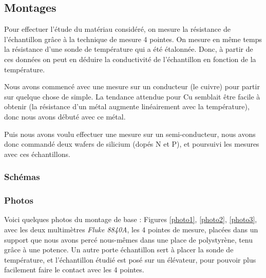 \subsection{Montages}
Pour effectuer l'étude du matériau considéré, on mesure la résistance de l'échantillon grâce à la technique de mesure 4 pointes.
On mesure en même temps la résistance d'une sonde de température qui a été étalonnée.
Donc, à partir de ces données on peut en déduire la conductivité de l'échantillon en fonction de la température.

Nous avons commencé avec une mesure sur un conducteur (le cuivre) pour partir sur quelque chose de simple.
La tendance attendue pour Cu semblait être facile à obtenir (la résistance d'un métal augmente linéairement avec la température), donc nous avons débuté avec ce métal.

Puis nous avons voulu effectuer une mesure sur un semi-conducteur, nous avons donc commandé deux wafers de silicium (dopés N et P), et poursuivi les mesures avec ces échantillons.

\subsubsection{Schémas}

\subsubsection{Photos}

Voici quelques photos du montage de base : Figures \ref{photo1}, \ref{photo2}, \ref{photo3}, avec les deux multimètres \emph{Fluke 8840A}, les 4 pointes de mesure, placées dans un support que nous avons percé nous-mêmes dans une place de polystyrène, tenu grâce à une potence. Un autre porte échantillon sert à placer la sonde de température, et l'échantillon étudié est posé sur un élévateur, pour pouvoir plus facilement faire le contact avec les 4 pointes.

